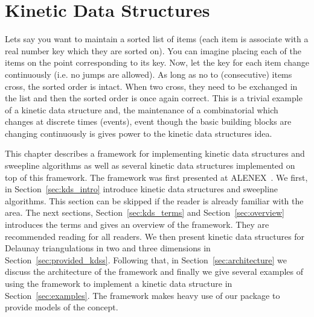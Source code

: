 
\chapter{Kinetic Data Structures}
\label{chapter-kds}
\minitoc



\def\note#1{$\langle\langle${\bf #1}$\rangle\rangle$}


%

Lets say you want to maintain a sorted list of items (each item is
associate with a real number key which they are sorted on). You can
imagine placing each of the items on the point corresponding to its
key. Now, let the key for each item change continuously (i.e. no jumps
are allowed). As long as no to (consecutive) items cross, the sorted
order is intact. When two cross, they need to be exchanged in the list
and then the sorted order is once again correct. This is a trivial
example of a kinetic data structure and, the maintenance of a
combinatorial which changes at discrete times (events), event though
the basic building blocks are changing continuously is gives power to
the kinetic data structures idea.

This chapter describes a framework for implementing kinetic data
structures and sweepline algorithms as well as several kinetic data
structures implemented on top of this framework. The framework was
first presented at ALENEX~\cite{cgal:gkr-cfhm-04}. We first, in
Section~\ref{sec:kds_intro} introduce kinetic data structures and
sweepline algorithms. This section can be skipped if the reader is
already familiar with the area. The next sections,
Section~\ref{sec:kds_terms} and Section~\ref{sec:overview} introduces
the terms and gives an overview of the framework. They are recommended
reading for all readers. We then present kinetic data structures for
Delaunay triangulations in two and three dimensions in
Section~\ref{sec:provided_kdss}. Following that, in
Section~\ref{sec:architecture} we discuss the architecture of the
framework and finally we give several examples of using the framework
to implement a kinetic data structure in
Section~\ref{sec:examples}. The framework makes heavy use of our
 package to provide models of the
 concept.

